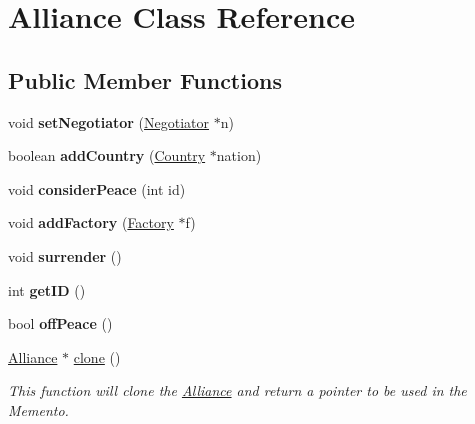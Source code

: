 \hypertarget{classAlliance}{}\section{Alliance Class Reference}
\label{classAlliance}
\subsection*{Public Member Functions}
\begin{DoxyCompactItemize}
\item 
\mbox{\label{classAlliance_a80f9a001ba5bad946690111b775c2349}} 
void {\bfseries set\+Negotiator} (\hyperlink{classNegotiator}{Negotiator} $\ast$n)
\item 
\mbox{\label{classAlliance_a26c9fafa4009ec606c7e50b99c51007d}} 
boolean {\bfseries add\+Country} (\hyperlink{classCountry}{Country} $\ast$nation)
\item 
\mbox{\label{classAlliance_abe193fa5d233a0bcc561a6732a050725}} 
void {\bfseries consider\+Peace} (int id)
\item 
\mbox{\label{classAlliance_ab1ba99d78866c13e17031afa3bdd727e}} 
void {\bfseries add\+Factory} (\hyperlink{classFactory}{Factory} $\ast$f)
\item 
\mbox{\label{classAlliance_ad3b8272ccec63d3a32b7e241434948e9}} 
void {\bfseries surrender} ()
\item 
\mbox{\label{classAlliance_a7f23330454f02b0056eb92bd2072359d}} 
int {\bfseries get\+ID} ()
\item 
\mbox{\label{classAlliance_aa774a70192e6d4fd034cc7689b3ff5a8}} 
bool {\bfseries off\+Peace} ()
\item 
\hyperlink{classAlliance}{Alliance} $\ast$ \hyperlink{classAlliance_adc67a41223565105889493f9cfd350d0}{clone} ()
\begin{DoxyCompactList}\small\item\em This function will clone the \hyperlink{classAlliance}{Alliance} and return a pointer to be used in the Memento. \end{DoxyCompactList}\end{DoxyCompactItemize}


